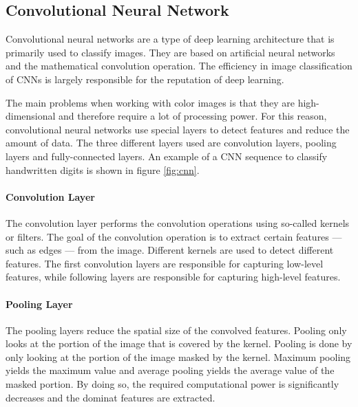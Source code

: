 \subsection{Convolutional Neural Network}
\label{subsec:cnn}

Convolutional neural networks are a type of deep learning architecture that is primarily used to classify images.
They are based on artificial neural networks and the mathematical convolution operation.
The efficiency in image classification of CNNs is largely responsible for the reputation of deep learning.

The main problems when working with color images is that they are high-dimensional and therefore require a lot of processing power.
For this reason, convolutional neural networks use special layers to detect features and reduce the amount of data.
The three different layers used are convolution layers, pooling layers and fully-connected layers.
An example of a CNN sequence to classify handwritten digits is shown in figure \ref{fig:cnn}.

\paragraph{Convolution Layer}
The convolution layer performs the convolution operations using so-called kernels or filters.
The goal of the convolution operation is to extract certain features --- such as edges --- from the image.
Different kernels are used to detect different features.
The first convolution layers are responsible for capturing low-level features, while following layers are responsible for capturing high-level features.
\clearpage

\paragraph{Pooling Layer}
The pooling layers reduce the spatial size of the convolved features.
Pooling only looks at the portion of the image that is covered by the kernel.
Pooling is done by only looking at the portion of the image masked by the kernel.
Maximum pooling yields the maximum value and average pooling yields the average value of the masked portion.
By doing so, the required computational power is significantly decreases and the dominat features are extracted.
\\


